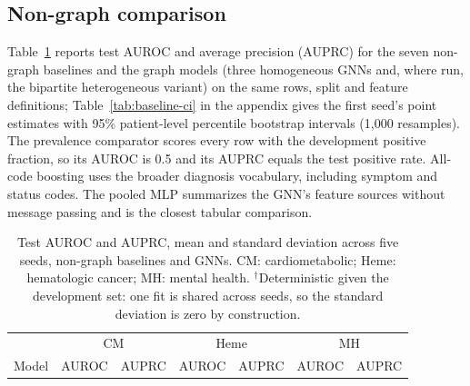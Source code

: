 \subsection{Non-graph comparison}
Table~\ref{tab:baseline} reports test AUROC and average precision (AUPRC) for the seven non-graph baselines and the graph models (three homogeneous GNNs and, where run, the bipartite heterogeneous variant) on the same rows, split and feature definitions; Table~\ref{tab:baseline-ci} in the appendix gives the first seed's point estimates with 95\% patient-level percentile bootstrap intervals (1{,}000 resamples). The prevalence comparator scores every row with the development positive fraction, so its AUROC is 0.5 and its AUPRC equals the test positive rate. All-code boosting uses the broader diagnosis vocabulary, including symptom and status codes. The pooled MLP summarizes the GNN's feature sources without message passing and is the closest tabular comparison.

\begin{table}[t]
\centering
\caption{Test AUROC and AUPRC, mean and standard deviation across five seeds, non-graph baselines and GNNs. CM: cardiometabolic; Heme: hematologic cancer; MH: mental health. $^{\dagger}$Deterministic given the development set: one fit is shared across seeds, so the standard deviation is zero by construction.}
\label{tab:baseline}
\small
\begin{tabular}{lcccccc}
\hline
 & \multicolumn{2}{c}{CM} & \multicolumn{2}{c}{Heme} & \multicolumn{2}{c}{MH} \\
Model & AUROC & AUPRC & AUROC & AUPRC & AUROC & AUPRC \\
\hline

\hline
\end{tabular}
\end{table}

